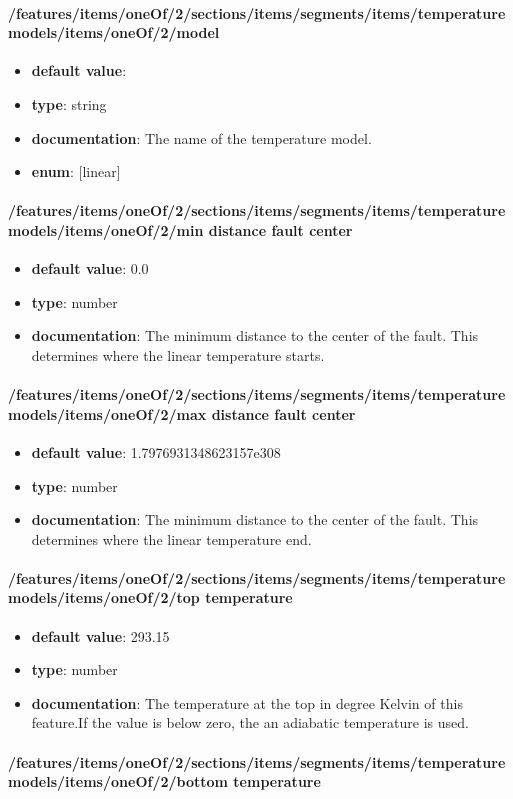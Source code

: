 \paragraph{/features/items/oneOf/2/sections/items/segments/items/temperature models/items/oneOf/2/model}
\begin{itemize}\item {\bf default value}: 
\item {\bf type}: string
\item {\bf documentation}: The name of the temperature model.
\item {\bf enum}: [linear]\end{itemize}\paragraph{/features/items/oneOf/2/sections/items/segments/items/temperature models/items/oneOf/2/min distance fault center}
\begin{itemize}\item {\bf default value}: 0.0
\item {\bf type}: number
\item {\bf documentation}: The minimum distance to the center of the fault. This determines where the linear temperature starts.
\end{itemize}\paragraph{/features/items/oneOf/2/sections/items/segments/items/temperature models/items/oneOf/2/max distance fault center}
\begin{itemize}\item {\bf default value}: 1.7976931348623157e308
\item {\bf type}: number
\item {\bf documentation}: The minimum distance to the center of the fault. This determines where the linear temperature end.
\end{itemize}\paragraph{/features/items/oneOf/2/sections/items/segments/items/temperature models/items/oneOf/2/top temperature}
\begin{itemize}\item {\bf default value}: 293.15
\item {\bf type}: number
\item {\bf documentation}: The temperature at the top in degree Kelvin of this feature.If the value is below zero, the an adiabatic temperature is used.
\end{itemize}\paragraph{/features/items/oneOf/2/sections/items/segments/items/temperature models/items/oneOf/2/bottom temperature}
